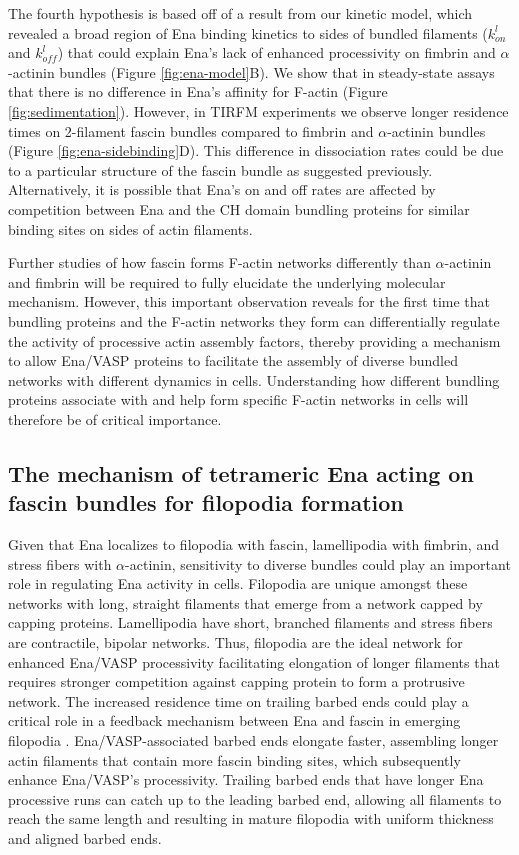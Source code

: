 The fourth hypothesis is based off of a result from our kinetic model, which revealed a broad region of Ena binding kinetics to sides of bundled filaments ($k_{on}^{l}$ and $k_{off}^{l}$) that could explain Ena's lack of enhanced processivity on fimbrin and $\alpha$-actinin bundles (Figure \ref{fig:ena-model}B). We show that in steady-state assays that there is no difference in Ena's affinity for F-actin (Figure \ref{fig:sedimentation}). However, in TIRFM experiments we observe longer residence times on 2-filament fascin bundles compared to fimbrin and $\alpha$-actinin bundles (Figure \ref{fig:ena-sidebinding}D). This difference in dissociation rates could be due to a particular structure of the fascin bundle as suggested previously. Alternatively, it is possible that Ena's on and off rates are affected by competition between Ena and the CH domain bundling proteins for similar binding sites on sides of actin filaments.

Further studies of how fascin forms F-actin networks differently than $\alpha$-actinin and fimbrin will be required to fully elucidate the underlying molecular mechanism. However, this important observation reveals for the first time that bundling proteins and the F-actin networks they form can differentially regulate the activity of processive actin assembly factors, thereby providing a mechanism to allow Ena/VASP proteins to facilitate the assembly of diverse bundled networks with different dynamics in cells. Understanding how different bundling proteins associate with and help form specific F-actin networks in cells will therefore be of critical importance.

\subsection{The mechanism of tetrameric Ena acting on fascin bundles for filopodia formation}\label{filopodia-mechanism}

Given that Ena localizes to filopodia with fascin, lamellipodia with fimbrin, and stress fibers with $\alpha$-actinin, sensitivity to diverse bundles could play an important role in regulating Ena activity in cells. Filopodia are unique amongst these networks with long, straight filaments that emerge from a network capped by capping proteins. Lamellipodia have short, branched filaments and stress fibers are contractile, bipolar networks. Thus, filopodia are the ideal network for enhanced Ena/VASP processivity facilitating elongation of longer filaments that requires stronger competition against capping protein to form a protrusive network. The increased residence time on trailing barbed ends could play a critical role in a feedback mechanism between Ena and fascin in emerging filopodia \citep{winkelman_ena/vasp_2014}. Ena/VASP-associated barbed ends elongate faster, assembling longer actin filaments that contain more fascin binding sites, which subsequently enhance Ena/VASP's processivity. Trailing barbed ends that have longer Ena processive runs can catch up to the leading barbed end, allowing all filaments to reach the same length and resulting in mature filopodia with uniform thickness and aligned barbed ends.
 
